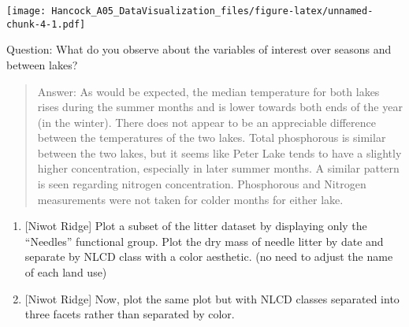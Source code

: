 \documentclass[
]{article}
\newenvironment{Shaded}{\begin{snugshade}}{\end{snugshade}}
\newcommand{\CommentTok}[1]{\textcolor[rgb]{0.56,0.35,0.01}{\textit{#1}}}
\newcommand{\DataTypeTok}[1]{\textcolor[rgb]{0.13,0.29,0.53}{#1}}
\newcommand{\FloatTok}[1]{\textcolor[rgb]{0.00,0.00,0.81}{#1}}
\newcommand{\KeywordTok}[1]{\textcolor[rgb]{0.13,0.29,0.53}{\textbf{#1}}}
\newcommand{\NormalTok}[1]{#1}
\newcommand{\OperatorTok}[1]{\textcolor[rgb]{0.81,0.36,0.00}{\textbf{#1}}}
\newcommand{\OtherTok}[1]{\textcolor[rgb]{0.56,0.35,0.01}{#1}}
\newcommand{\StringTok}[1]{\textcolor[rgb]{0.31,0.60,0.02}{#1}}
\begin{document}
\texttt{[image: Hancock\_A05\_DataVisualization\_files/figure-latex/unnamed-chunk-4-1.pdf]}

Question: What do you observe about the variables of interest over
seasons and between lakes?

\begin{quote}
Answer: As would be expected, the median temperature for both lakes
rises during the summer months and is lower towards both ends of the
year (in the winter). There does not appear to be an appreciable
difference between the temperatures of the two lakes. Total phosphorous
is similar between the two lakes, but it seems like Peter Lake tends to
have a slightly higher concentration, especially in later summer months.
A similar pattern is seen regarding nitrogen concentration. Phosphorous
and Nitrogen measurements were not taken for colder months for either
lake.
\end{quote}

\begin{enumerate}
\def\labelenumi{\arabic{enumi}.}
\setcounter{enumi}{5}
\item
  {[}Niwot Ridge{]} Plot a subset of the litter dataset by displaying
  only the ``Needles'' functional group. Plot the dry mass of needle
  litter by date and separate by NLCD class with a color aesthetic. (no
  need to adjust the name of each land use)
\item
  {[}Niwot Ridge{]} Now, plot the same plot but with NLCD classes
  separated into three facets rather than separated by color.
\end{enumerate}

\begin{Shaded}
\end{Shaded}
\end{document}
